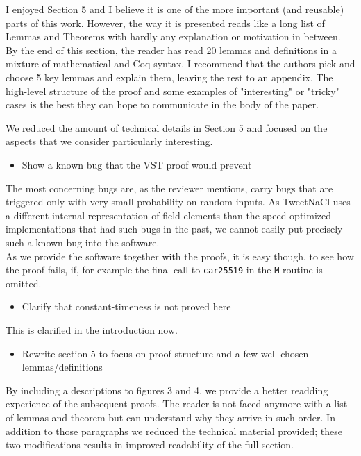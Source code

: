 I enjoyed Section 5 and I believe it is one of the more important (and reusable) parts of this work. However, the way it is presented reads like a long list of Lemmas and Theorems with hardly any explanation or motivation in between. By the end of this section, the reader has read 20 lemmas and definitions in a mixture of mathematical and Coq syntax. I recommend that the authors pick and choose 5 key lemmas and explain them, leaving the rest to an appendix. The high-level structure of the proof and some examples of "interesting" or "tricky" cases is the best they can hope to communicate in the body of the paper.
\begin{answer}
  We reduced the amount of technical details in Section 5 and focused on the aspects that we consider particularly interesting.
\end{answer}


\begin{center}
\end{center}

\begin{itemize}
  \item Show a known bug that the VST proof would prevent
\end{itemize}
\begin{answer}
  The most concerning bugs are, as the reviewer mentions, carry bugs that are triggered only with
  very small probability on random inputs. As TweetNaCl uses a different internal representation
  of field elements than the speed-optimized implementations that had such bugs in the past, we
  cannot easily put precisely such a known bug into the software.\\
  As we provide the software together with the proofs, it is easy though, to see how the proof fails,
  if, for example the final call to \texttt{car25519} in the \texttt{M} routine is omitted.
\end{answer}
\begin{itemize}
  \item Clarify that constant-timeness is not proved here
\end{itemize}
\begin{answer}
  This is clarified in the introduction now.
\end{answer}
\begin{itemize}
  \item Rewrite section 5 to focus on proof structure and a few well-chosen lemmas/definitions
\end{itemize}
\begin{answer}
  By including a descriptions to figures 3 and 4, we provide a better readding experience of the subsequent proofs.
  The reader is not faced anymore with a list of lemmas and theorem but can understand why they arrive in such order.
  In addition to those paragraphs we reduced the technical material provided; these two modifications results in
  improved readability of the full section.
\end{answer}


